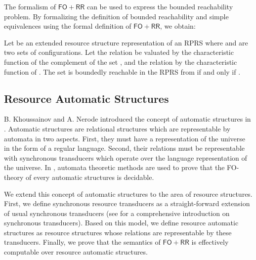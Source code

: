 \documentclass{LMCS}
\newcommand{\FORR}{\ensuremath{\mathsf{FO\!\!+\!\!RR}}}
\newcommand{\RPRS}{\textsf{RPRS}}
\begin{document}
The formalism of \FORR{} can be used to express the bounded reachability
problem. By formalizing the definition of bounded reachability and 
simple equivalences using the formal definition of \FORR{}, we obtain:

\begin{prop}\label{prop:BoundedReachabilityIsFORRExpressible}
  Let  be an extended
resource structure representation of an \RPRS{} where  and  are two 
sets of configurations. Let the relation  be valuated by the 
characteristic function of the complement of the set , and the relation  by the 
characteristic function of .
The set  is boundedly reachable in the \RPRS{} from  if and only if
  .
\end{prop}


\subsection{Resource Automatic Structures}
\label{subsec:ResourceAutomaticStructures}

B. Khoussainov and A. Nerode introduced the concept of automatic structures in
\cite{automatic-structures}. Automatic structures are relational structures
which are representable by automata in two aspects. First, they must have a
representation of the universe in the form of a regular language. Second, their
relations must be representable with synchronous transducers which operate over
the language representation of the universe. In \cite{automatic-structures},
automata theoretic methods are used to prove that the FO-theory of every 
automatic structures is decidable. 

We extend this concept of automatic structures to the area of resource
structures. First, we define synchronous resource transducers as a
straight-forward extension of usual synchronous transducers (see
\cite{khoussainov-automata-theory-and-app} for a comprehensive introduction on
synchronous transducers). Based on this model, we define
resource automatic structures as resource structures whose relations are
representable by these transducers. Finally, we prove that the semantics of
\FORR{} is effectively computable over resource automatic structures. 
\end{document}
